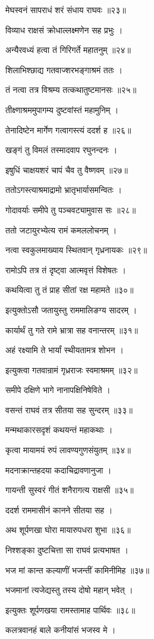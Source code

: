 मेघस्वनं सापराधं शरं संधाय राघवः ॥२३॥

विव्याध राक्षसं क्रोधाल्लक्ष्मणेन सह प्रभुः ।

अन्यैरवध्यं हत्वा तं गिरिगर्ते महातनुम् ॥२४॥

शिलाभिश्छाद्य गतवाज्शरभङ्गाश्रमं ततः ।

तं नत्वा तत्र विश्रम्य तत्कथातुष्टमानसः ॥२५॥

तीक्ष्णाश्रममुपागम्य दुष्टवांस्तं महामुनिम् ।

तेनादिष्टेन मार्गेण गत्वागस्त्यं ददर्श ह ॥२६॥

खङ्गं तु विमलं तस्मादवाप रघुनन्दनः ।

इषुधिं चाक्षयशरं चापं चैव तु वैष्णवम् ॥२७॥

ततोऽगस्त्याश्रमाद्रामो भ्रातृभार्यासमन्वितः ।

गोदावर्याः समीपे तु पञ्चवट्यामुवास सः ॥२८॥

ततो जटायुरभ्येत्य रामं कमललोचनम् ।

नत्वा स्वकुलमाख्याय स्थितवान् गृध्रनायकः ॥२९॥

रामोऽपि तत्र तं दृष्ट्वा आत्मवृत्तं विशेषतः ।

कथयित्वा तु तं प्राह सीतां रक्ष महामते ॥३०॥

इत्युक्तोऽसौ जतायुस्तु राममालिङग्य सादरम् ।

कार्यार्थं तु गते रामे भ्रात्रा सह वनान्तरम् ॥३१॥

अहं रक्ष्यामि ते भार्यां स्थीयतामत्र शोभन ।

इत्युक्त्वा गतवान्रामं गृध्रराजः स्वमाश्रमम् ॥३२॥

समीपे दक्षिणे भागे नानापक्षिनिषेविते ।

वसन्तं राघवं तत्र सीतया सह सुन्दरम् ॥३३॥

मन्मथाकारसदृशं कथयन्तं महाकथाः ।

कृत्वा मायामयं रुपं लावण्यगुणसंयुतम् ॥३४॥

मदनाक्रान्तहदया कदाचिद्रावणानुजा ।

गायन्ती सुस्वरं गीतं शनैरागत्य राक्षसी ॥३५॥

ददर्श राममासीनं कानने सीतया सह ।

अथ शूर्पणखा घोरा मायारुपधरा शुभा ॥३६॥

निश्शङ्का दुष्टचित्ता सा राघवं प्रत्यभाषत ।

भज मां कान्त कल्याणीं भजन्तीं कामिनीमिह ॥३७॥

भजमानां त्यजेद्यस्तु तस्य दोषो महान् भवेत् ।

इत्युक्तः शूर्पणखया रामस्तामाह पार्थिवः ॥३८॥

कलत्रवानहं बाले कनीयांसं भजस्व मे ।

